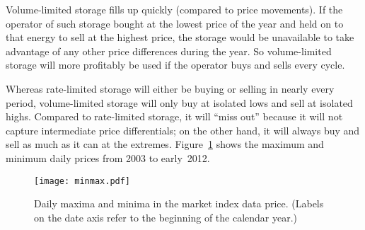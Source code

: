 \documentclass[12pt, a4paper]{article}
\begin{document}
Volume-limited storage fills up quickly (compared to price
movements). If the operator of such storage bought at the lowest price
of the year and held on to that energy to sell at the highest price,
the storage would be unavailable to take advantage of any other price
differences during the year. So volume-limited storage will more
profitably be used if the operator buys and sells every cycle.

Whereas rate-limited storage will either be buying or selling in
nearly every period, volume-limited storage will only buy at isolated
lows and sell at isolated highs. Compared to rate-limited storage, it
will ``miss out'' because it will not capture intermediate price
differentials; on the other hand, it will always buy and sell as much
as it can at the extremes. Figure~\ref{fig:minmax} shows the maximum
and minimum daily prices from 2003 to early~2012.

\begin{figure}[htb]
\centering
\texttt{[image: minmax.pdf]}
\caption{Daily maxima and minima in the market index data
  price. (Labels on the date axis refer to the beginning of the
  calendar year.)}
\label{fig:minmax}
\end{figure}
\end{document}
